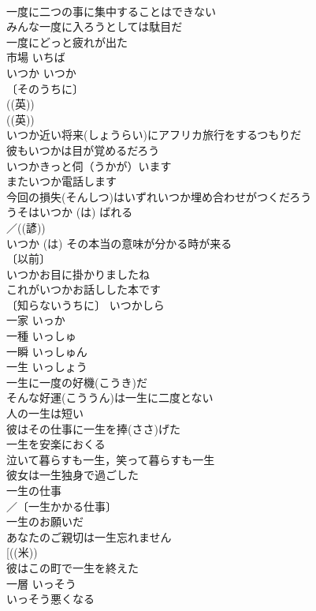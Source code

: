 \documentclass[8pt]{extreport}
\begin{document}
\begin{CJK}{UTF8}{min}
\\	一度に二つの事に集中することはできない 
\\	みんな一度に入ろうとしては駄目だ 
\\	一度にどっと疲れが出た 
\\	市場	いちば	
\\	いつか	いつか	
\\	〔そのうちに〕
\\	((英)) 
\\	((英)) 
\\	いつか近い将来(しょうらい)にアフリカ旅行をするつもりだ 
\\	彼もいつかは目が覚めるだろう 
\\	いつかきっと伺（うかが）います 
\\	またいつか電話します 
\\	今回の損失(そんしつ)はいずれいつか埋め合わせがつくだろう 
\\	うそはいつか (は) ばれる 
\\	／((諺)) 
\\	いつか (は) その本当の意味が分かる時が来る 
\\	〔以前〕
\\	いつかお目に掛かりましたね 
\\	これがいつかお話しした本です 
\\	〔知らないうちに〕 いつかしら
\\	一家	いっか	
\\	一種	いっしゅ	
\\	一瞬	いっしゅん	
\\	一生	いっしょう	
\\	一生に一度の好機(こうき)だ 
\\	そんな好運(こううん)は一生に二度とない 
\\	人の一生は短い 
\\	彼はその仕事に一生を捧(ささ)げた 
\\	一生を安楽におくる 
\\	泣いて暮らすも一生，笑って暮らすも一生 
\\	彼女は一生独身で過ごした 
\\	一生の仕事 
\\	／〔一生かかる仕事〕
\\	一生のお願いだ 
\\	あなたのご親切は一生忘れません 
\\	[((米)) 
\\	彼はこの町で一生を終えた 
\\	一層	いっそう	
\\	いっそう悪くなる 

\end{CJK}
\end{document}
